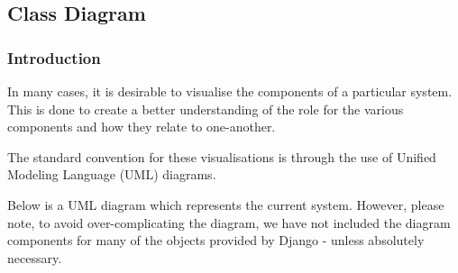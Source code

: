 \subsection{Class Diagram}
	\subsubsection{Introduction}
		In many cases, it is desirable to visualise the components of a particular system. This is done to create a better understanding of the role for the various components and how they relate to one-another.
		
		The standard convention for these visualisations is through the use of Unified Modeling Language (UML) diagrams.
		
		Below is a UML diagram which represents the current system. However, please note, to avoid over-complicating the diagram, we have not included the diagram components for many of the objects provided by Django - unless absolutely necessary.